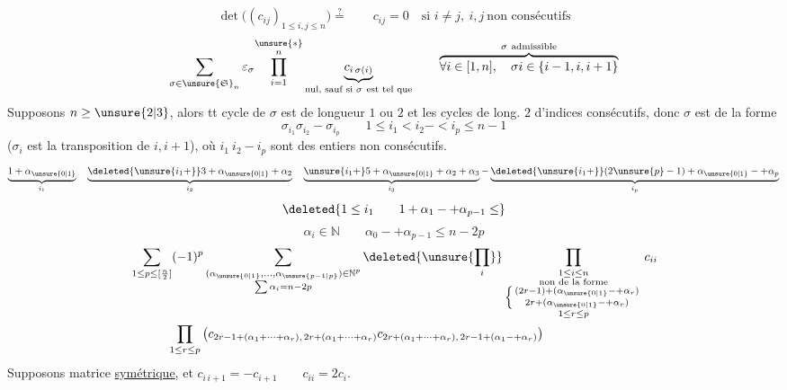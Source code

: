 \[
\det\bigl((c_{ij})_{1\leq i,j\leq n}\bigr)\overset{?}{=}
\qquad c_{ij}=0\quad\text{si }i\neq j,\ i,j\ \text{non consécutifs}
\]
\[
\sum_{\sigma\in\unsure{\mathfrak S}_n}
\varepsilon_\sigma\overset{\unsure{*}}{\prod_{i=1}^{n}}
\underbrace{c_{i\,\sigma(i)}}_{\text{nul, sauf si }\sigma\ \text{est tel que}}
\qquad
\overbrace{\forall i\in[1,n],\quad\sigma i\in\{i-1,i,i+1\}}^{\sigma\ \text{admissible}}
\]
Supposons $n\geq\unsure{2|3}$, alors tt cycle de $\sigma$ est de longueur $1$ ou $2$
et les cycles de long. $2$  d'indices consécutifs,
donc $\sigma$ est de la forme
\[
\sigma_{i_1}\sigma_{i_2}\mathbin{-}\sigma_{i_p}
\qquad1\leq i_1<i_2\mathbin{-}<i_p\leq n-1
\]
($\sigma_i$ est la transposition de $i,i+1$), où $i_1\ i_2\mathbin{-}i_p$
sont des entiers non consécutifs.
\[
\underbrace{1+\alpha_{\unsure{0|1}}}_{i_1}\quad
\underbrace{\deleted{\unsure{i_1+}}3+\alpha_{\unsure{0|1}}+\alpha_2}_{i_2}\quad
\underbrace{\unsure{i_1+}5+\alpha_{\unsure{0|1}}+\alpha_2+\alpha_3}_{i_3}
\mathbin{-}
\underbrace{\deleted{\unsure{i_1+}}(2\unsure{p}-1)+\alpha_{\unsure{0|1}}\mathbin{-}+\alpha_p}_{i_p}
\]
\[
\deleted{1\leq i_1\qquad1+\alpha_1\mathbin{-}+\alpha_{p-1}\leq}
\]
\[
\alpha_i\in\mathbb N\qquad
\alpha_0\mathbin{-}+\alpha_{p-1}\leq n-2p
\]
\[
\begin{aligned}
&\sum_{1\leq p\leq[\frac n2]}(-1)^p
\sum_{\substack{(\alpha_{\unsure{0|1}},\ldots,\alpha_{\unsure{p-1|p}})\in\mathbb N^p\\
\sum\alpha_i=n-2p}}
\deleted{\unsure{\prod_i}}
\prod_{\substack{1\leq i\leq n\\
\text{non de la forme}\\
\left\{\begin{smallmatrix}(2r-1)+(\alpha_{\unsure{0|1}}\mathbin{-}+\alpha_r)\\
2r+(\alpha_{\unsure{0|1}}\mathbin{-}+\alpha_r)\end{smallmatrix}\right.\\
1\leq r\leq p}}
c_{ii}\\
&\hspace{3em}\prod_{1\leq r\leq p}
\left(
c_{2r-1+(\alpha_1+\cdots+\alpha_r),\,2r+(\alpha_1+\cdots+\alpha_r)}
c_{2r+(\alpha_1+\cdots+\alpha_r),\,2r-1+(\alpha_1\mathbin{-}+\alpha_r)}
\right)
\end{aligned}
\]
Supposons matrice \uline{symétrique}, et
$c_{i\,i+1}=-c_{i+1}\qquad c_{ii}=2c_i$.

